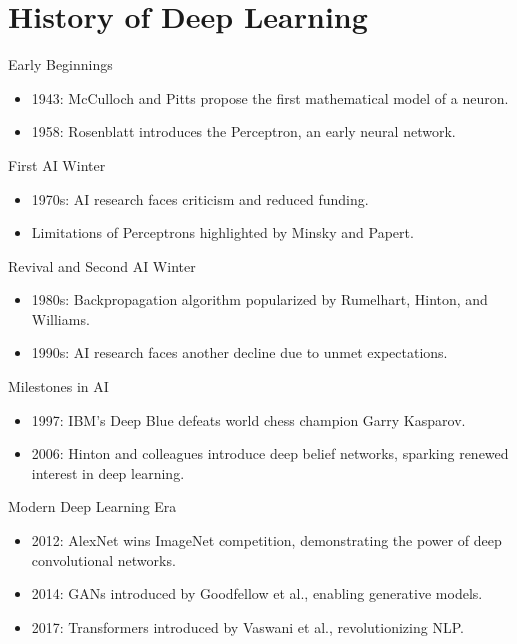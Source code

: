 \documentclass{beamer}
\begin{document}
\section{History of Deep Learning}
\begin{frame}{Early Beginnings}
    \begin{itemize}
        \item 1943: McCulloch and Pitts propose the first mathematical model of a neuron.
        \item 1958: Rosenblatt introduces the Perceptron, an early neural network.
    \end{itemize}
\end{frame}

\begin{frame}{First AI Winter}
    \begin{itemize}
        \item 1970s: AI research faces criticism and reduced funding.
        \item Limitations of Perceptrons highlighted by Minsky and Papert.
    \end{itemize}
\end{frame}

\begin{frame}{Revival and Second AI Winter}
    \begin{itemize}
        \item 1980s: Backpropagation algorithm popularized by Rumelhart, Hinton, and Williams.
        \item 1990s: AI research faces another decline due to unmet expectations.
    \end{itemize}
\end{frame}

\begin{frame}{Milestones in AI}
    \begin{itemize}
        \item 1997: IBM's Deep Blue defeats world chess champion Garry Kasparov.
        \item 2006: Hinton and colleagues introduce deep belief networks, sparking renewed interest in deep learning.
    \end{itemize}
\end{frame}

\begin{frame}{Modern Deep Learning Era}
    \begin{itemize}
        \item 2012: AlexNet wins ImageNet competition, demonstrating the power of deep convolutional networks.
        \item 2014: GANs introduced by Goodfellow et al., enabling generative models.
        \item 2017: Transformers introduced by Vaswani et al., revolutionizing NLP.
    \end{itemize}
\end{frame}
\end{document}
